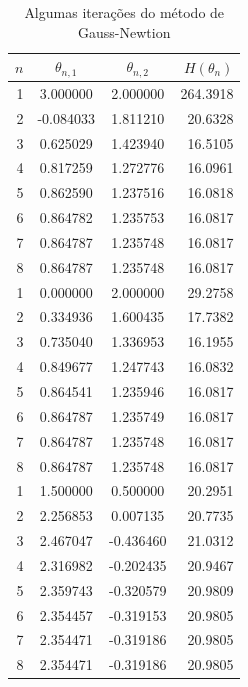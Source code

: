 \documentclass{abnt}
\begin{document}
\begin{table}
        \begin{center}
                \begin{tabular}{ r | c c r  }
                        \hline
                        $n$ & $\theta_{n,1}$ & $\theta_{n,2}$ & $H(\theta_n)$ \\
                        \hline
                        1 & 3.000000 & 2.000000 & 264.3918 \\
                        2 & -0.084033 & 1.811210 & 20.6328 \\
                        3 & 0.625029 & 1.423940 & 16.5105 \\
                        4 & 0.817259 & 1.272776 & 16.0961 \\
                        5 & 0.862590 & 1.237516 & 16.0818 \\
                        6 & 0.864782 & 1.235753 & 16.0817 \\
                        7 & 0.864787 & 1.235748 & 16.0817 \\
                        8 & 0.864787 & 1.235748 & 16.0817 \\
                        \hline
                        1 & 0.000000 & 2.000000 & 29.2758 \\
                        2 & 0.334936 & 1.600435 & 17.7382 \\
                        3 & 0.735040 & 1.336953 & 16.1955 \\
                        4 & 0.849677 & 1.247743 & 16.0832 \\
                        5 & 0.864541 & 1.235946 & 16.0817 \\
                        6 & 0.864787 & 1.235749 & 16.0817 \\
                        7 & 0.864787 & 1.235748 & 16.0817 \\
                        8 & 0.864787 & 1.235748 & 16.0817 \\
                        \hline
                        1 & 1.500000 & 0.500000 & 20.2951 \\
                        2 & 2.256853 & 0.007135 & 20.7735 \\
                        3 & 2.467047 & -0.436460 & 21.0312 \\
                        4 & 2.316982 & -0.202435 & 20.9467 \\
                        5 & 2.359743 & -0.320579 & 20.9809 \\
                        6 & 2.354457 & -0.319153 & 20.9805 \\
                        7 & 2.354471 & -0.319186 & 20.9805 \\
                        8 & 2.354471 & -0.319186 & 20.9805 \\
                        \hline
                \end{tabular}
        \end{center}
        \caption{Algumas iterações do método de Gauss-Newtion}
        \label{resultados_gn}
\end{table}
\end{document}
